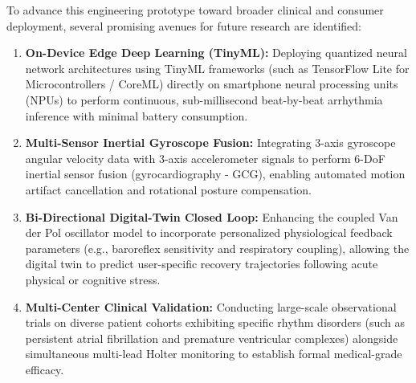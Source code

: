 To advance this engineering prototype toward broader clinical and consumer deployment, several promising avenues for future research are identified:
\begin{enumerate}
    \item \textbf{On-Device Edge Deep Learning (TinyML):} Deploying quantized neural network architectures using TinyML frameworks \cite{warden2019tinyml} (such as TensorFlow Lite for Microcontrollers / CoreML) directly on smartphone neural processing units (NPUs) to perform continuous, sub-millisecond beat-by-beat arrhythmia inference with minimal battery consumption.
    \item \textbf{Multi-Sensor Inertial Gyroscope Fusion:} Integrating 3-axis gyroscope angular velocity data with 3-axis accelerometer signals to perform 6-DoF inertial sensor fusion (gyrocardiography - GCG), enabling automated motion artifact cancellation and rotational posture compensation.
    \item \textbf{Bi-Directional Digital-Twin Closed Loop:} Enhancing the coupled Van der Pol oscillator model to incorporate personalized physiological feedback parameters (e.g., baroreflex sensitivity and respiratory coupling), allowing the digital twin to predict user-specific recovery trajectories following acute physical or cognitive stress.
    \item \textbf{Multi-Center Clinical Validation:} Conducting large-scale observational trials on diverse patient cohorts exhibiting specific rhythm disorders (such as persistent atrial fibrillation and premature ventricular complexes) alongside simultaneous multi-lead Holter monitoring to establish formal medical-grade efficacy.
\end{enumerate}
